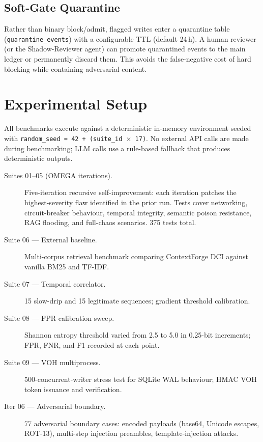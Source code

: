 \documentclass[11pt]{article}
\begin{document}
\subsection{Soft-Gate Quarantine}
\label{sec:quarantine}

Rather than binary block/admit, flagged writes enter a quarantine table
(\texttt{quarantine\_events}) with a configurable TTL (default 24\,h). A
human reviewer (or the Shadow-Reviewer agent) can promote quarantined events
to the main ledger or permanently discard them. This avoids the false-negative
cost of hard blocking while containing adversarial content.

\section{Experimental Setup}
\label{sec:setup}

All benchmarks execute against a deterministic in-memory environment
seeded with \texttt{random\_seed = 42 + (suite\_id $\times$ 17)}.
No external API calls are made during benchmarking; LLM calls use a
rule-based fallback that produces deterministic outputs.

\begin{description}
  \item[Suites 01--05 (OMEGA iterations).] Five-iteration recursive
    self-improvement: each iteration patches the highest-severity flaw
    identified in the prior run. Tests cover networking, circuit-breaker
    behaviour, temporal integrity, semantic poison resistance, RAG flooding,
    and full-chaos scenarios. 375 tests total.

  \item[Suite 06 --- External baseline.] Multi-corpus retrieval benchmark
    comparing ContextForge DCI against vanilla BM25 and TF-IDF.

  \item[Suite 07 --- Temporal correlator.] 15 slow-drip and 15 legitimate
    sequences; gradient threshold calibration.

  \item[Suite 08 --- FPR calibration sweep.] Shannon entropy threshold
    varied from 2.5 to 5.0 in 0.25-bit increments; FPR, FNR, and F1
    recorded at each point.

  \item[Suite 09 --- VOH multiprocess.] 500-concurrent-writer stress test
    for SQLite WAL behaviour; HMAC VOH token issuance and verification.

  \item[Iter 06 --- Adversarial boundary.] 77 adversarial boundary cases:
    encoded payloads (base64, Unicode escapes, ROT-13), multi-step injection
    preambles, template-injection attacks.
\end{description}
\end{document}
